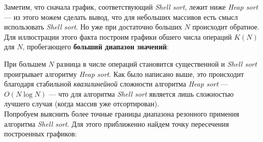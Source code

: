 \documentclass[a4paper,12pt,titlepage,finall]{article}
\begin{document}
Заметим, что сначала график, соответствующий \textit{Shell sort}, лежит ниже \textit{Heap sort} — из этого можем сделать вывод, что для небольших массивов есть смысл использовать \textit{Shell sort}. Но уже при достаточно больших $N$ происходит обратное. Для иллюстрации этого факта построим графики обшего числа операций $K(N)$ для $N$, пробегающего \textbf{больший диапазон значений}: \\


\par
При большем $N$ разница в числе операций становится существенной и \textit{Shell sort} проигрывает алгоритму \textit{Heap sort}. Как было написано выше, это происходит благодаря стабильной \textit{квазилинейной} сложности алгоритма \textit{Heap sort} — $O(N\log N)$ — что для алгоритма \textit{Shell sort} является лишь сложностью лучшего случая (когда массив уже отсортирован). 
\\

Попробуем выяснить более точные границы диапазона резонного примения алгоритма \textit{Shell sort}. Для этого приближенно найдем точку пересечения построенных графиков:\\
\end{document}
